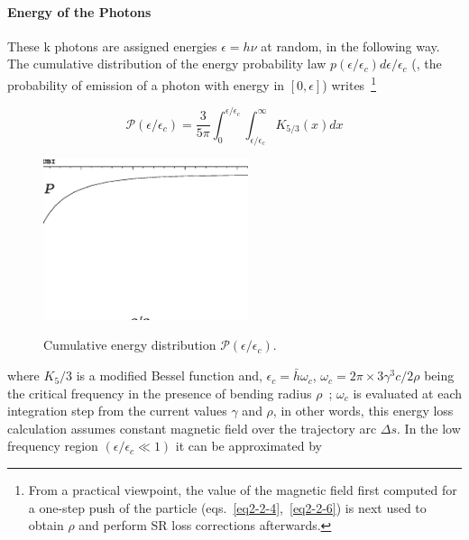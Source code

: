 \paragraph{Energy of the Photons}

These k photons are assigned energies $\epsilon=h\nu$ at random, in the following way. The cumulative 
distribution of the energy probability law $p(\epsilon/\epsilon_c)d\epsilon/\epsilon_c$  
(\ie, the probability of emission of a photon with  energy in  $[0,\epsilon]$) writes~\footnote{From 
a practical viewpoint, the value of the magnetic field first computed for a 
one-step push of the particle  (eqs.~\ref{eq2-2-4},~\ref{eq2-2-6}) is next used to  obtain  
$\rho$ and perform SR loss corrections afterwards.} 

\begin{equation}
\label{EqSK53}
 \mathcal{P}(\epsilon/\epsilon_c) = \dfrac{3}{5\pi} \int_0^{\epsilon/\epsilon_c} \int_{\epsilon/\epsilon_c}^\infty K_{5/3}(x) dx
\end{equation}
%
\begin{figure}
  \begin{center} 
\vspace{-2mm}
\includegraphics*[bbllx=20,bblly=100,bburx=550,bbury=450,width=6cm]{G.eps}
\vspace{-0mm}

 {\small \centering 
       Cumulative energy distribution   $\mathcal{P}(\epsilon/\epsilon_c)$. }
  \end{center}
\end{figure}
where $K_5/3$ is a modified Bessel function and, $\epsilon_c= \bar{h} \omega_c$, 
$\omega_c=2 \pi \times 3 \gamma^3 c / 2 \rho$ being the critical frequency  in 
the presence of bending radius $\rho$~;  $\omega_c$ is evaluated at each integration step from 
the current values $\gamma$ and $\rho$, in other words, this energy loss calculation 
assumes constant  magnetic field  over the trajectory arc $\Delta s$. 
In the low frequency region $(\epsilon/\epsilon_c \ll 1)$ it can be approximated by 

